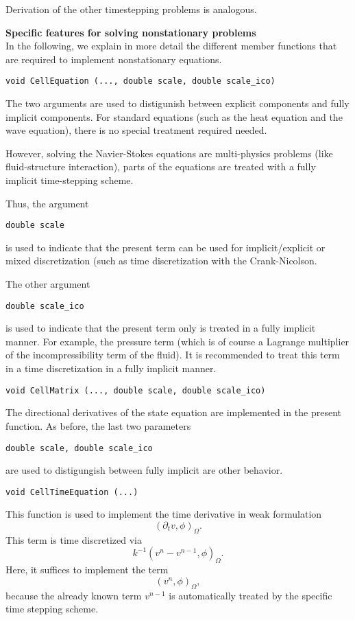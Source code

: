 Derivation of the other timestepping problems is analogous.


\textbf{Specific features for 
solving nonstationary problems}\\

In the following, we explain in more detail the 
different member functions that are required to
implement nonstationary equations.

\begin{verbatim}
void CellEquation (..., double scale, double scale_ico)
\end{verbatim}
The two arguments 
are used to distigunish between explicit 
components and fully implicit components. 
For standard equations (such as the heat 
equation and the wave equation), there is 
no special treatment required needed. 

However, solving the Navier-Stokes equations are 
multi-physics problems (like fluid-structure
interaction), parts of the equations are treated
with a fully implicit time-stepping scheme.

Thus, the argument
\begin{verbatim}
double scale
\end{verbatim}
is used to indicate that the present term 
can be used for implicit/explicit or mixed 
discretization (such as time discretization with
the Crank-Nicolson.

The other argument
\begin{verbatim}
double scale_ico
\end{verbatim} 
is used to indicate that the present term 
only is treated in a fully implicit manner. 
For example, the pressure term (which is of course
a Lagrange multiplier of the incompressibility 
term of the fluid). It is recommended to treat 
this term in a time discretization in a fully 
implicit manner. 

\begin{verbatim}
void CellMatrix (..., double scale, double scale_ico)
\end{verbatim}
The directional derivatives of the state equation
are implemented in the present function. As before,
the last two parameters
\begin{verbatim}
double scale, double scale_ico
\end{verbatim} 
are used to distigungish between fully implicit 
are other behavior. 

\begin{verbatim}
void CellTimeEquation (...) 
\end{verbatim}
This function is used to implement the 
time derivative in weak formulation 
\begin{equation*}
(\partial_t v, \phi)_{\Omega}.
\end{equation*}
This term is time discretized via
\begin{equation*}
k^{-1} (v^n - v^{n-1} , \phi)_{\Omega}. 
\end{equation*}
Here, it suffices to implement the term
\begin{equation*}
(v^n, \phi)_{\Omega},
\end{equation*}
because the already known term $v^{n-1}$ is 
automatically treated by the specific time
stepping scheme. 

